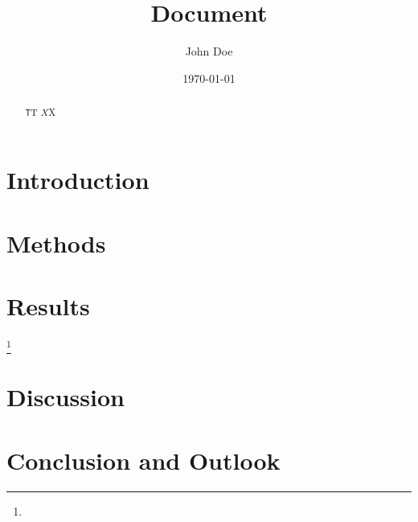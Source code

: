 \def\bibpath{references.bib}
\def\myfont{charter} %
	


\title{Document}
\author{John Doe}
\date{\today}



\maketitle

\begin{abstract}
	\blindtext
	
	\texttt{T}T $X$X
\end{abstract}

\section{Introduction}


\blindmathpaper\cite{schurmann_konstruieren_2007}


\section{Methods}

\Blindtext

\section{Results}

\Blindtext\footnote{\blindtext}

\section{Discussion}

\blindtext\cite{wachter_angewandter_2017}

\section{Conclusion and Outlook}

\blindtext


\appendix

\printbibliography


